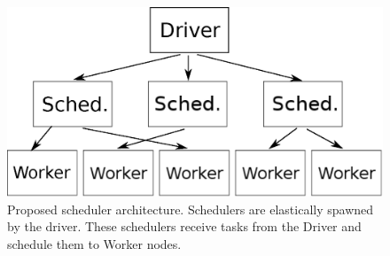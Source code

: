\begin{figure}[t!]
  \begin{center}
    \includegraphics[scale=0.45]{scheduler_architecture.eps}
  \end{center}
  \caption{Proposed scheduler architecture. Schedulers are elastically spawned by the driver. These schedulers receive tasks from the Driver and schedule them to Worker nodes.}
  \label{fig:schedarch}
\end{figure}

